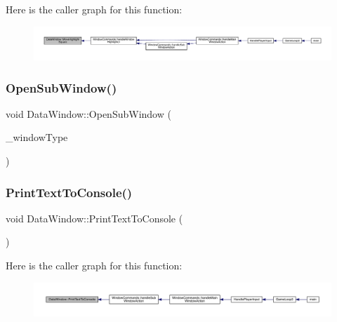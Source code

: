 Here is the caller graph for this function\+:
\nopagebreak
\begin{figure}[H]
\begin{center}
\leavevmode
\includegraphics[width=350pt]{d1/def/class_data_window_a2047f47dfa6093e3f7c4bf30cd176a46_icgraph}
\end{center}
\end{figure}
\mbox{\label{class_data_window_a3313c90eabd00824c775e3a23e82e3a9}} 
\subsubsection{\texorpdfstring{Open\+Sub\+Window()}{OpenSubWindow()}}
{\footnotesize\ttfamily void Data\+Window\+::\+Open\+Sub\+Window (\begin{DoxyParamCaption}\item[{\mbox{\hyperlink{_data_window_8hpp_a3c1e0c6fe947fdbea7502497b27cf44d}{En\+Data\+Window\+Type}}}]{\+\_\+window\+Type }\end{DoxyParamCaption})}

\mbox{\label{class_data_window_a0092110104aa5506e15ac1dc1d3b0eac}} 
\subsubsection{\texorpdfstring{Print\+Text\+To\+Console()}{PrintTextToConsole()}}
{\footnotesize\ttfamily void Data\+Window\+::\+Print\+Text\+To\+Console (\begin{DoxyParamCaption}{ }\end{DoxyParamCaption})}

Here is the caller graph for this function\+:
\nopagebreak
\begin{figure}[H]
\begin{center}
\leavevmode
\includegraphics[width=350pt]{d1/def/class_data_window_a0092110104aa5506e15ac1dc1d3b0eac_icgraph}
\end{center}
\end{figure}
\mbox{\label{class_data_window_a66d08b9e2df3b4960fe4e030aabf61be}} 
